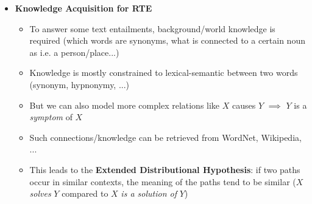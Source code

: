 \begin{itemize}
\begin{itemize}
\begin{figure}[ht]
		\end{figure}
	\end{itemize}
	\item \textbf{Knowledge Acquisition for RTE}
	\begin{itemize}
		\item To answer some text entailments, background/world knowledge is required (which words are synonyms, what is connected to a certain noun as i.e. a person/place...)
		\item Knowledge is mostly constrained to lexical-semantic between two words (synonym, hypnonymy, ...)
		\item But we can also model more complex relations like $X$ causes $Y$ $\implies$ $Y$ is a \textit{symptom} of $X$
		\item Such connections/knowledge can be retrieved from WordNet, Wikipedia, ...
		\item This leads to the \textbf{Extended Distributional Hypothesis}: if two paths occur in similar contexts, the meaning of the paths tend to be similar ($X$ \textit{solves} $Y$ compared to $X$ \textit{is a solution of }$Y$)
	\end{itemize}
\end{itemize}
